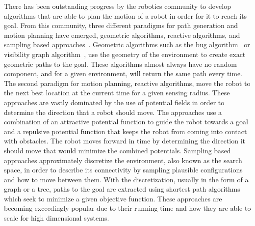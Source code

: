 There has been outstanding progress by the robotics community to develop
algorithms that are able to plan the motion of a robot in order for it to reach
its goal. From this community, three different paradigms for path generation
and motion planning have emerged, geometric algorithms, reactive algorithms,
and sampling based approaches~\cite{choset, lavalle}. Geometric algorithms such
as the bug algorithm~\cite{weir} or visibility graph algorithm~\cite{vis}, use
the geometry of the environment to create exact geometric paths to the goal.
These algorithms almost always have no random component, and for a given
environment, will return the same path every time. The second paradigm for
motion planning, reactive algorithms, move the robot to the next best location
at the current time for a given sensing radius. These approaches are vastly
dominated by the use of potential fields in order to determine the direction
that a robot should move. The approaches use a combination of an attractive
potential function to guide the robot towards a goal and a repulsive potential
function that keeps the robot from coming into contact with obstacles. The
robot moves forward in time by determining the direction it should move that
would minimize the combined potentials. Sampling based approaches approximately
discretize the environment, also known as the search space, in order to
describe its connectivity by sampling plausible configurations and how to move
between them.  With the discretization, usually in the form of a graph or a
tree, paths to the goal are extracted using shortest path algorithms which seek
to minimize a given objective function. These approaches are becoming
exceedingly popular due to their running time and how they are able to scale
for high dimensional systems.

